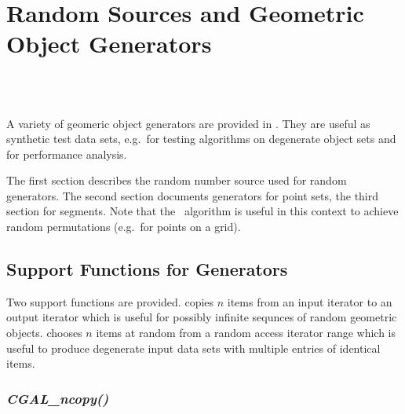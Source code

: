 
\beforecprogskip\medskipamount
\aftercprogskip\medskipamount
\ccParDims

\chapter{Random Sources and Geometric Object Generators}
\label{chapterGenerators}
\\
\\


A variety of geomeric object generators are provided in \cgal. They
are useful as synthetic test data sets, e.g.~for testing algorithms on
degenerate object sets and for performance analysis.

The first section describes the random number source used for random
generators. The second section documents generators for point sets,
the third section for segments. Note that the \stl\ algorithm
 is useful in this context to achieve random
permutations (e.g.~for points on a grid).




\newpage
\section{Support Functions for Generators}

Two support functions are provided.  copies $n$
items from an input iterator to an output iterator which is useful for
possibly infinite sequnces of random geometric objects.
 chooses $n$ items at random from a random
access iterator range which is useful to produce degenerate input data
sets with multiple entries of identical items.

\subsection{{\it CGAL\_ncopy()}}
\label{sectionNCopy}

